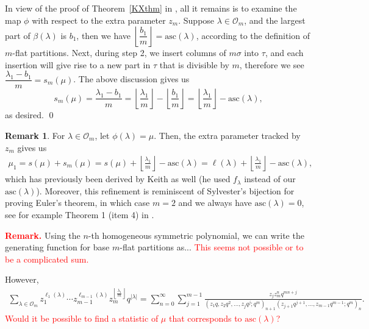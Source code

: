 \documentclass[11pt,reqno]{amsart}
\numberwithin{equation}{section}
\theoremstyle{plain}
\theoremstyle{definition}
\newtheorem{remark}[theorem]{Remark}
\newcommand{\OO}{\mathcal{O}}
\def\asc{\mathrm{asc}}
\begin{document}
In view of the proof of Theorem~\ref{KXthm} in \cite{KX}, all it remains is to examine the map $\phi$ with respect to the extra parameter $z_m$. Suppose $\lambda\in\OO_m$, and the largest part of $\beta(\lambda)$ is $b_1$, then we have $\left\lfloor\dfrac{b_1}{m}\right\rfloor=\asc(\lambda)$, according to the definition of $m$-flat partitions. Next, during step 2, we insert columns of $m\sigma$ into $\tau$, and each insertion will give rise to a new part in $\tau$ that is divisible by $m$, therefore we see $\dfrac{\lambda_1-b_1}{m}=s_m(\mu)$. The above discussion gives us
\begin{equation*}
s_m(\mu)=\dfrac{\lambda_1-b_1}{m}=\left\lfloor\dfrac{\lambda_1}{m}\right\rfloor-\left\lfloor\dfrac{b_1}{m}\right\rfloor=\left\lfloor\dfrac{\lambda_1}{m}\right\rfloor-\asc(\lambda),
\end{equation*}
as desired. \hfill \qed

\begin{remark}
For $\lambda\in\OO_m$, let $\phi(\lambda)=\mu$. Then, the extra parameter tracked by $z_m$ gives us
\begin{align*}
\mu_1=s(\mu)+s_m(\mu)=s(\mu)+\left\lfloor\frac{\lambda_1}{m}\right\rfloor-\asc(\lambda)=\ell(\lambda)+\left\lfloor\frac{\lambda_1}{m}\right\rfloor-\asc(\lambda),
\end{align*}
which has previously been derived by Keith \cite[Theorem~6]{Kei-the} as well (he used $f_{\lambda}$ instead of our $\asc(\lambda)$). Moreover, this refinement is reminiscent of Sylvester's bijection for proving Euler's theorem, in which case $m=2$ and we always have $\asc(\lambda)=0$, see for example Theorem 1 (item 4) in \cite{Zen}.
\end{remark}




\iffalse

\textcolor{red}{{\bf Remark.}} Using the $n$-th homogeneous symmetric polynomial, we can write the generating function for base $m$-flat partitions as... \textcolor{red}{This seems not possible or to be a complicated sum.}




However,
\begin{align*}
\sum_{\lambda\in \OO_m} z_1^{\ell_1(\lambda)}\cdots z_{m-1}^{\ell_{m-1}(\lambda)}z_m^{\left\lfloor\frac{\lambda_1}{m}\right\rfloor}q^{|\lambda|}
=\sum_{n=0}^{\infty} \sum_{j=1}^{m-1} \frac{ z_j z_m^n q^{mn+j}}{(z_1q, z_2q^2,\ldots, z_{j} q^{j};q^m)_{n+1} (z_{j+1}q^{j+1},\ldots, z_{m-1}q^{m-1};q^m)_n}.
\end{align*}
\textcolor{red}{Would it be possible to find a statistic of $\mu$ that corresponds to $\asc(\lambda)$?}
\end{document}
